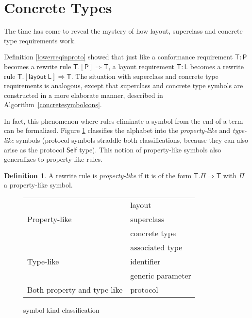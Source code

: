 \documentclass[headsepline,bibliography=totoc]{scrreport}
\newcommand{\namesym}[1]{\mathsf{#1}}
\newcommand{\proto}[1]{\bm{\mathsf{#1}}}
\newcommand{\protosym}[1]{[\proto{#1}]}
\newcommand{\layoutsym}[1]{[\mathsf{layout\;#1}]}
\theoremstyle{definition}
\theoremstyle{definition}
\newtheorem{definition}{Definition}[chapter]
\theoremstyle{definition}
\begin{document}
\section{Concrete Types}\label{concretetypes}

The time has come to reveal the mystery of how layout, superclass and concrete type requirements work.

Definition \ref{lowerreqinproto} showed that just like a conformance requirement $\namesym{T}\colon\proto{P}$ becomes a rewrite rule $\namesym{T}.\protosym{P}\Rightarrow\namesym{T}$, a layout requirement $\namesym{T}\colon\namesym{L}$ becomes a rewrite rule $\namesym{T}.\layoutsym{L}\Rightarrow\namesym{T}$. The situation with superclass and concrete type requirements is analogous, except that superclass and concrete type symbols are constructed in a more elaborate manner, described in Algorithm~\ref{concretesymbolcons}.

In fact, this phenomenon where rules eliminate a symbol from the end of a term can be formalized. Figure \ref{symbolclass} classifies the alphabet into the \emph{property-like} and \emph{type-like} symbols (protocol symbols straddle both classifications, because they can also arise as the protocol $\proto{Self}$ type). This notion of property-like symbols also generalizes to property-like rules.
\begin{definition} A rewrite rule is \emph{property-like} if it is of the form $\namesym{T}.\namesym{\Pi}\Rightarrow\namesym{T}$ with $\namesym{\Pi}$ a property-like symbol.
\end{definition}

\begin{figure}\caption{symbol kind classification}\label{symbolclass}
\begin{center}
\begin{tabular}{|l|l|}
\hline
\multirow{3}{14em}{Property-like}& layout\\
&superclass\\
&concrete type\\
\hline
\multirow{3}{14em}{Type-like}& associated type\\
&identifier\\
&generic parameter\\
\hline
\multirow{1}{14em}{Both property and type-like}& protocol\\
\hline
\end{tabular}
\end{center}
\end{figure}
\end{document}
